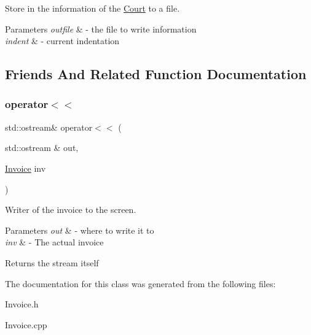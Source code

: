Store in the information of the \mbox{\hyperlink{class_court}{Court}} to a file. 


\begin{DoxyParams}{Parameters}
{\em outfile} & -\/ the file to write information \\
\hline
{\em indent} & -\/ current indentation \\
\hline
\end{DoxyParams}


\subsection{Friends And Related Function Documentation}
\mbox{\label{class_invoice_a1ff3da2cc7abd9df37b2936772ce9ff7}} 
\subsubsection{\texorpdfstring{operator$<$$<$}{operator<<}}
{\footnotesize\ttfamily std\+::ostream\& operator$<$$<$ (\begin{DoxyParamCaption}\item[{std\+::ostream \&}]{out,  }\item[{\mbox{\hyperlink{class_invoice}{Invoice}}}]{inv }\end{DoxyParamCaption})\hspace{0.3cm}{\ttfamily [friend]}}



Writer of the invoice to the screen. 


\begin{DoxyParams}{Parameters}
{\em out} & -\/ where to write it to \\
\hline
{\em inv} & -\/ The actual invoice \\
\hline
\end{DoxyParams}
\begin{DoxyReturn}{Returns}
the stream itself 
\end{DoxyReturn}


The documentation for this class was generated from the following files\+:\begin{DoxyCompactItemize}
\item 
Invoice.\+h\item 
Invoice.\+cpp\end{DoxyCompactItemize}
